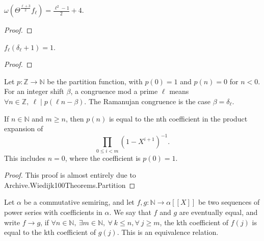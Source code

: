 \begin{theorem}
  \label{thm:Filt_Theta_l_add_three_div_two}
  \leanok
  $ \omega (\Theta^{\frac{\ell + 3}{2}} f_\ell)= \frac{\ell^2 - 1}{2} + 4 $.

\end{theorem}
\begin{proof}
  \leanok
\end{proof}

\begin{lemma}
  \label{lem:fl_delta_add_one}
  \leanok
  $f_\ell (\delta_\ell + 1) = 1$. 
\end{lemma}
\begin{proof}
  \leanok
\end{proof}



\begin{definition}
  \label{def:ramanujan_congruence}
  \leanok
  Let $p : \mathbb{Z} \to \mathbb{N}$ be the partition function, with $p(0) = 1$
  and $p(n) = 0$ for $n < 0$. For an integer shift $\beta$, a congruence mod a prime
  $\ell$ means $\forall n \in \mathbb{Z}, \: \ell \mid p(\ell n - \beta)$.
  The Ramanujan congruence is the case $\beta = \delta_\ell$.
\end{definition}


\begin{theorem}
  \label{thm:partitionProduct_eq}
  \leanok
  If $n \in \mathbb{N}$ and $m \ge n$, then $p(n)$ is equal to the nth coefficient in the product expansion of
  \[ \prod_{0 \le i < m} (1 - X^{i + 1})^{-1}. \]
  This includes $n = 0$, where the coefficient is $p(0) = 1$.
\end{theorem}
\begin{proof}
  \leanok
  This proof is almost entirely due to Archive.Wiedijk100Theorems.Partition
\end{proof}


\begin{definition} 
  \label{def:eventuallyEq}
  \leanok
  Let $\alpha$ be a commutative semiring, and let $f, g : \mathbb{N} \to \alpha [[X]]$ be two sequences of power series with coefficients in $\alpha$.
  We say that $f$ and $g$ are eventually equal, and write $f \longrightarrow g$, if
  $\forall n \in \mathbb{N}, \: \exists m \in \mathbb{N}, \: \forall \: k \le n, \forall \: j \ge m$, 
  the kth coefficient of $f(j)$ is equal to the kth coefficient of $g(j)$. This is an equivalence relation.
\end{definition}

